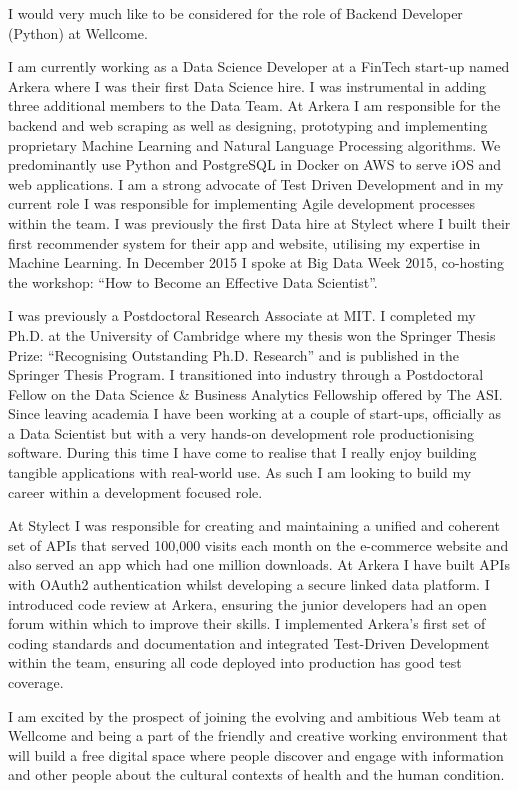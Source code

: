 \documentclass[11pt,a4paper,sans]{moderncv}        %
\begin{document}
I would very much like to be considered for the role of Backend Developer (Python) at Wellcome.

I am currently working as a Data Science Developer at a FinTech start-up named Arkera where I was their first Data Science hire.
%
I was instrumental in adding three additional members to the Data Team.
%
At Arkera I am responsible for the backend and web scraping as well as designing, prototyping and implementing proprietary Machine Learning and Natural Language Processing algorithms.
%
We predominantly use Python and PostgreSQL in Docker on AWS to serve iOS and web applications.
%
I am a strong advocate of Test Driven Development and in my current role I was responsible for implementing Agile development processes within the team.
%
I was previously the first Data hire at Stylect where I built their first recommender system for their app and website, utilising my expertise in Machine Learning.
%
In December 2015 I spoke at Big Data Week 2015, co-hosting the workshop: ``How to Become an Effective Data Scientist''. 
%

I was previously a Postdoctoral Research Associate at MIT. 
%
I completed my Ph.D. at the University of Cambridge where my thesis won the Springer Thesis Prize: ``Recognising Outstanding Ph.D. Research'' and is published in the Springer Thesis Program. 
%
I transitioned into industry through a Postdoctoral Fellow on the Data Science \& Business Analytics Fellowship offered by The ASI. 
%
Since leaving academia I have been working at a couple of start-ups, officially as a Data Scientist but with a very hands-on development role 
productionising software.  
%
During this time I have come to realise that I really enjoy building tangible applications with real-world use. 
%
As such I am looking to build my career within a development focused role.

At Stylect I was responsible for creating and maintaining a unified and coherent set of APIs that served 100,000 visits each month 
on the e-commerce website and also served an app which had one million downloads.
%
At Arkera I have built APIs with OAuth2 authentication whilst developing a secure linked data platform.
%
I introduced code review at Arkera, ensuring the junior developers had an open forum within which to improve their skills.
%
I implemented Arkera's first set of coding standards and documentation and integrated Test-Driven Development within the team, ensuring 
all code deployed into production has good test coverage.
%

I am excited by the prospect of joining the evolving and ambitious Web team at Wellcome and being a part of the 
friendly and creative working environment that will build a free digital space where people 
discover and engage with information and other people about the cultural contexts of health and the human condition.
\end{document}
